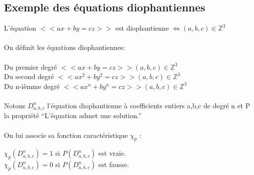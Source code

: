 \documentclass[12pt]{article}   %
\begin{document}
\subsection {Exemple des équations diophantiennes}
L'équation \begin{math}<<ax+by=cz>>\end{math} est diophantienne \begin{math}\Longleftrightarrow\end{math}\begin{math}(a,b,c)\in\mathbb{Z}^3\end{math}
\\\\ On définit les équations diophantiennes: \\\\Du premier degré \begin{math}<<ax+by=cz>>\end{math}\begin{math}(a,b,c)\in\mathbb{Z}^3\end{math}
\\Du second degré \begin{math}<<ax^2+by^2=cz>>\end{math}\begin{math}(a,b,c)\in\mathbb{Z}^3\end{math}
\\Du n-ièmme degré \begin{math}<<ax^n+by^n=cz>>\end{math}\begin{math}(a,b,c)\in\mathbb{Z}^3\end{math}
\\\\Notons \begin{math}D^n_{a,b,c}\end{math} l'équation diophantienne à coefficients entiers a,b,c de degré n et P la propriété "`L'équation admet une solution."'
\\\\On lui associe sa fonction caractéristique \begin{math}\chi _{p}\end{math} :
\begin{center}
\begin{math}\chi _{p}(D^n_{a,b,c})=1\end{math} si \begin{math}P(D^n_{a,b,c})\end{math} est vraie.
\\\begin{math}\chi _{p}(D^n_{a,b,c})=0\end{math} si \begin{math}P(D^n_{a,b,c})\end{math} est fausse.
\end{center}
\end{document}
